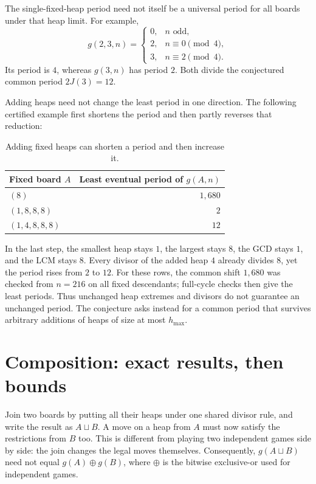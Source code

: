 \documentclass[10pt,a4paper]{article}
\newcommand{\join}{\sqcup}
\begin{document}
The single-fixed-heap period need not itself be a universal period
for all boards under that heap limit. For example,
\[
 g(2,3,n)=
 \begin{cases}
 0,&n\text{ odd},\\
 2,&n\equiv0\pmod4,\\
 3,&n\equiv2\pmod4.
 \end{cases}
\]
Its period is $4$, whereas $g(3,n)$ has period $2$. Both divide
the conjectured common period $2J(3)=12$.

Adding heaps need not change the least period in one direction.
The following certified example first shortens the period and
then partly reverses that reduction:

\begin{table}[H]
\centering
\begin{tabular}{@{}l r@{}}
\toprule
Fixed board $A$ & Least eventual period of $g(A,n)$\\
\midrule
$(8)$ & $1{,}680$\\
$(1,8,8,8)$ & $2$\\
$(1,4,8,8,8)$ & $12$\\
\bottomrule
\end{tabular}
\caption{Adding fixed heaps can shorten a period and then increase it.}
\label{tab:periodjoins}
\end{table}

In the last step, the smallest heap stays $1$, the largest stays
$8$, the GCD stays $1$, and the LCM stays $8$. Every divisor of
the added heap $4$ already divides $8$, yet the period rises from
$2$ to $12$. For these rows, the common shift $1{,}680$ was checked
from $n=216$ on all fixed descendants; full-cycle checks then give
the least periods. Thus unchanged heap extremes and divisors do
not guarantee an unchanged period. The conjecture asks instead
for a common period that survives arbitrary additions of heaps
of size at most $h_{\max}$.

\section{Composition: exact results, then bounds}
\label{sec:composition}

Join two boards by putting all their heaps under one shared divisor
rule, and write the result as $A\join B$. A move on a heap from $A$
must now satisfy the restrictions from $B$ too. This is different
from playing two independent games side by side: the join changes
the legal moves themselves.
Consequently, $g(A\join B)$ need not equal $g(A)\mathbin{\oplus}g(B)$,
where $\oplus$ is the bitwise exclusive-or used for independent games.
\end{document}
